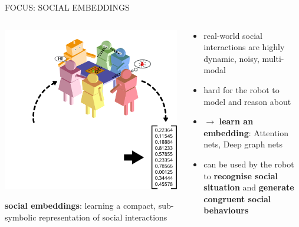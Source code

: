 \documentclass[xcolor=table]{beamer}
\begin{document}
\begin{frame}{FOCUS: SOCIAL EMBEDDINGS}
    \begin{columns}
        \begin{column}{0.5\linewidth}
    \begin{center}
        \includegraphics[width=\linewidth]{social-interactions/social-embeddings}
    \end{center}

        {\scriptsize
        \textbf{social embeddings}: learning a compact, sub-symbolic representation of social interactions
        }
        \end{column}
        \begin{column}{0.5\linewidth}
            \begin{itemize}
                \item real-world social interactions are highly dynamic, noisy,
                    multi-modal
                \item hard for the robot to model and reason about
                \item $\rightarrow$ \textbf{learn an embedding}: Attention nets, Deep
                    graph nets
                \item can be used by the robot to \textbf{recognise social situation} and
                    \textbf{generate congruent social behaviours}
            \end{itemize}
        \end{column}
    \end{columns}
\end{frame}
\end{document}

